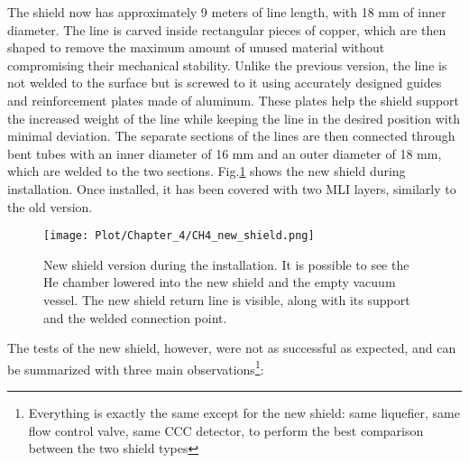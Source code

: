 \documentclass[12pt,a4paper]{report}
\begin{document}
        The shield now has approximately 9 meters of line length, with 18 mm of inner diameter. The line is carved inside rectangular pieces of copper, which are then shaped to remove the maximum amount of unused material without compromising their mechanical stability. Unlike the previous version, the line is not welded to the surface but is screwed to it using accurately designed guides and reinforcement plates made of aluminum. These plates help the shield support the increased weight of the line while keeping the line in the desired position with minimal deviation. The separate sections of the lines are then connected through bent tubes with an inner diameter of 16 mm and an outer diameter of 18 mm, which are welded to the two sections. Fig.\ref{CH4_new_shield} shows the new shield during installation. Once installed, it has been covered with two MLI layers, similarly to the old version.
        \begin{figure}[H]
        	\centering
        	\texttt{[image: Plot/Chapter\_4/CH4\_new\_shield.png]}
        	\caption{\small{New shield version during the installation. It is possible to see the He chamber lowered into the new shield and the empty vacuum vessel. The new shield return line is visible, along with its support and the welded connection point.}}
        	\label{CH4_new_shield}
        \end{figure}
        The tests of the new shield, however, were not as successful as expected, and can be summarized with three main observations\footnote{Everything is exactly the same except for the new shield: same liquefier, same flow control valve, same CCC detector, to perform the best comparison between the two shield types}:
\end{document}
